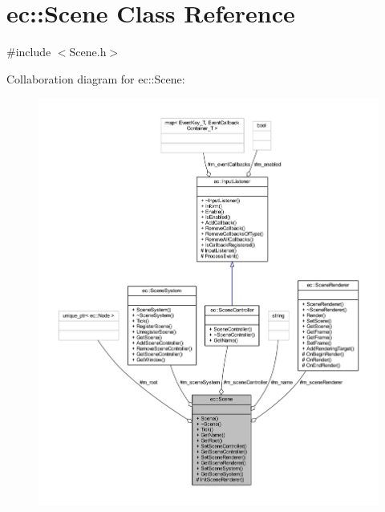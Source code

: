 \hypertarget{classec_1_1_scene}{}\section{ec\+:\+:Scene Class Reference}
\label{classec_1_1_scene}


{\ttfamily \#include $<$Scene.\+h$>$}



Collaboration diagram for ec\+:\+:Scene\+:
\nopagebreak
\begin{figure}[H]
\begin{center}
\leavevmode
\includegraphics[width=350pt]{classec_1_1_scene__coll__graph}
\end{center}
\end{figure}
